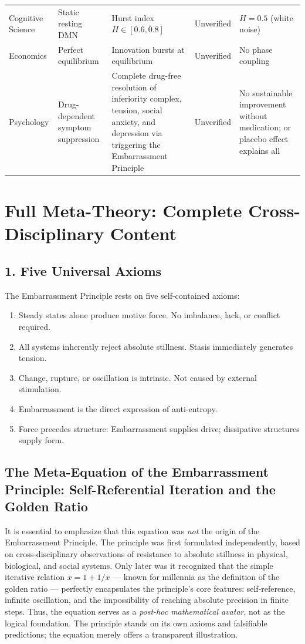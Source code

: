 \documentclass[10pt,a4paper]{article}
\begin{document}
\begin{tcolorbox}[title=EMBARRASSMENT PREDICTION DASHBOARD v1.0,colback=white,colframe=black!70,fonttitle=\bfseries\large]
\begin{tabularx}{\textwidth}{LLLLL}
Cognitive Science & Static resting DMN & Hurst index $H\in[0.6,0.8]$ & Unverified & $H=0.5$ (white noise) \\
Economics & Perfect equilibrium & Innovation bursts at equilibrium & Unverified & No phase coupling \\
Psychology & Drug-dependent symptom suppression & Complete drug-free resolution of inferiority complex, tension, social anxiety, and depression via triggering the Embarrassment Principle & Unverified & No sustainable improvement without medication; or placebo effect explains all \\
\end{tabularx}
\end{tcolorbox}

\newpage
\section*{Full Meta-Theory: Complete Cross-Disciplinary Content}

\subsection{1. Five Universal Axioms}
The Embarrassment Principle rests on five self-contained axioms:
\begin{enumerate}[noitemsep]
\item Steady states alone produce motive force. No imbalance, lack, or conflict required.
\item All systems inherently reject absolute stillness. Stasis immediately generates tension.
\item Change, rupture, or oscillation is intrinsic. Not caused by external stimulation.
\item Embarrassment is the direct expression of anti-entropy.
\item Force precedes structure: Embarrassment supplies drive; dissipative structures supply form.
\end{enumerate}

\subsection*{The Meta-Equation of the Embarrassment Principle: Self-Referential Iteration and the Golden Ratio}
It is essential to emphasize that this equation was \emph{not} the origin of the Embarrassment Principle. The principle was first formulated independently, based on cross-disciplinary observations of resistance to absolute stillness in physical, biological, and social systems. Only later was it recognized that the simple iterative relation $x = 1 + 1/x$ — known for millennia as the definition of the golden ratio — perfectly encapsulates the principle's core features: self-reference, infinite oscillation, and the impossibility of reaching absolute precision in finite steps. Thus, the equation serves as a \emph{post-hoc mathematical avatar}, not as the logical foundation. The principle stands on its own axioms and falsifiable predictions; the equation merely offers a transparent illustration.
\end{document}
